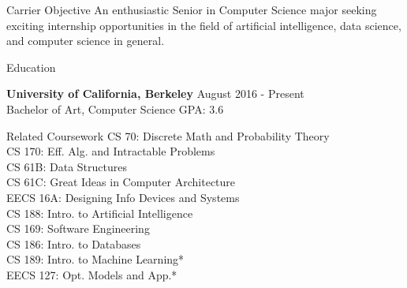 \documentclass{resume} %
\begin{document}

\begin{rSection}{Carrier Objective}
An enthusiastic Senior in Computer Science major seeking exciting internship opportunities in the field of artificial
intelligence, data science, and computer science in general.
\end{rSection}


\begin{rSection}{Education}

{\bf University of California, Berkeley} \hfill {August 2016 - Present} 
\\ Bachelor of Art, Computer Science \hfill{GPA: 3.6}

\end{rSection}


\begin{rSection2}{Related Coursework}
CS 70: Discrete Math and Probability Theory
\\ CS 170: Eff. Alg. and Intractable Problems
\\ CS 61B: Data Structures
\\ CS 61C: Great Ideas in Computer Architecture
\\ EECS 16A: Designing Info Devices and Systems
\\ CS 188: Intro. to Artificial Intelligence
\\ CS 169: Software Engineering
\\ CS 186: Intro. to Databases
\\ CS 189: Intro. to Machine Learning*
\\ EECS 127: Opt. Models and App.*
\end{rSection2}

\end{document}
